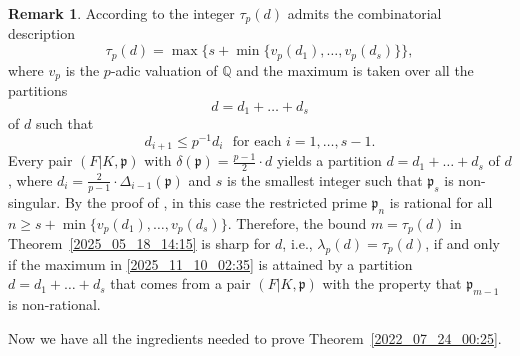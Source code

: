 \documentclass[12pt,reqno]{amsart}%
\theoremstyle{definition}
\newtheorem{rem}[prop]{Remark}
\theoremstyle{remark}
\newcommand{\Q}{\mathbb{Q}}
\newcommand{\pp}{\mathfrak{p}}
\newcommand{\de}{\delta}
\newcommand{\De}{\Delta}
\newcommand{\lam}{\lambda}
\begin{document}
\begin{rem}\label{2023_09_14_17:15}
According to \cite{HiSt22} the integer $\tau_p(d)$ admits the combinatorial description
\begin{equation}\label{2025_11_10_02:35}
    \tau_p(d) = \max\{ s + \min\{v_p(d_1),\dots,v_p(d_s)\} \},
\end{equation}
where $v_p$ is the $p$-adic valuation of $\Q$ and the maximum is taken over all the partitions
\[ d = d_1 + \dots + d_s \]
of $d$ such that 
\[ d_{i+1} \leq p^{-1} d_i \, \, \text{ for each $i=1,\dots,s-1$}. \]
Every pair $(F|K,\pp)$ with $\de(\pp) = \frac{p-1}2 {\cdot} d$ yields a partition $d = d_1 + \dots + d_s$ of $d$, where $d_i = \frac 2{p-1} {\cdot} \De_{i-1}(\pp)$ and $s$ is the smallest integer such that $\pp_s$ is non-singular.
By the proof of \cite[Proposition~2.22]{HiSt22}, in this case the restricted prime $\pp_n$ is rational for all $n\geq s + \min\{ v_p (d_1), \dots, v_p (d_s) \}$.
Therefore, the bound $m=\tau_p(d)$ in Theorem~\ref{2025_05_18_14:15} is sharp for $d$, i.e., $\lam_p(d) = \tau_p(d)$, if and only if the maximum in \eqref{2025_11_10_02:35} is attained by a partition $d = d_1 + \dots + d_s$ 
that comes from a pair $(F|K,\pp)$ with the property that $\pp_{m-1}$ is non-rational.


\end{rem}

Now we have all the ingredients needed to prove Theorem~\ref{2022_07_24_00:25}.
\end{document}
